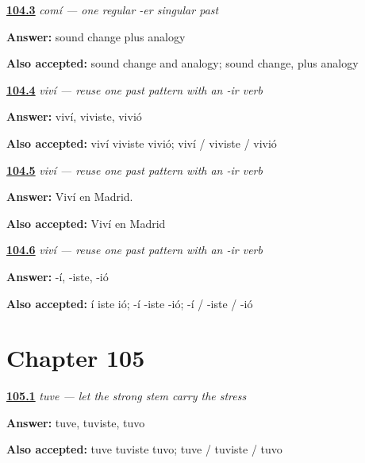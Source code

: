 \noindent\begin{minipage}[t]{\linewidth}
\raggedright
\hyperlink{review-ES-C15-comer-preterite-history}{\textbf{104.3}} \emph{comí — one regular -er singular past}\par
\small \textbf{Answer:} sound change plus analogy\par
\footnotesize \textbf{Also accepted:} sound change and analogy; sound change, plus analogy
\end{minipage}\par\medskip

\noindent\begin{minipage}[t]{\linewidth}
\raggedright
\hyperlink{review-ES-C15-comer-vivir-preterite-vivir-forms}{\textbf{104.4}} \emph{viví — reuse one past pattern with an -ir verb}\par
\small \textbf{Answer:} viví, viviste, vivió\par
\footnotesize \textbf{Also accepted:} viví viviste vivió; viví / viviste / vivió
\end{minipage}\par\medskip

\noindent\begin{minipage}[t]{\linewidth}
\raggedright
\hyperlink{review-ES-C15-comer-vivir-preterite-vivi-madrid}{\textbf{104.5}} \emph{viví — reuse one past pattern with an -ir verb}\par
\small \textbf{Answer:} Viví en Madrid.\par
\footnotesize \textbf{Also accepted:} Viví en Madrid
\end{minipage}\par\medskip

\noindent\begin{minipage}[t]{\linewidth}
\raggedright
\hyperlink{review-ES-C15-comer-vivir-preterite-shared-endings}{\textbf{104.6}} \emph{viví — reuse one past pattern with an -ir verb}\par
\small \textbf{Answer:} -í, -iste, -ió\par
\footnotesize \textbf{Also accepted:} í iste ió; -í -iste -ió; -í / -iste / -ió
\end{minipage}\par\medskip

\section*{Chapter 105}

\noindent\begin{minipage}[t]{\linewidth}
\raggedright
\hyperlink{review-ES-C15-tener-preterite-singular-forms}{\textbf{105.1}} \emph{tuve — let the strong stem carry the stress}\par
\small \textbf{Answer:} tuve, tuviste, tuvo\par
\footnotesize \textbf{Also accepted:} tuve tuviste tuvo; tuve / tuviste / tuvo
\end{minipage}\par\medskip

